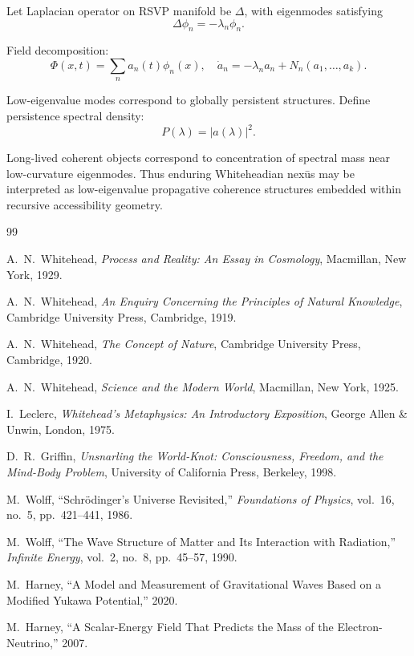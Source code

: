 \documentclass[12pt,a4paper]{article}
\begin{document}
Let Laplacian operator on RSVP manifold be \(\Delta\), with eigenmodes satisfying
\[
\Delta\phi_n
=
-\lambda_n\phi_n.
\]

Field decomposition:
\[
\Phi(x,t)
=
\sum_n
a_n(t)\phi_n(x),
\quad
\dot{a}_n
=
-\lambda_n a_n
+
N_n(a_1,\dots,a_k).
\]

Low-eigenvalue modes correspond to globally persistent structures. Define persistence spectral density:
\[
P(\lambda)
=
|a(\lambda)|^2.
\]

Long-lived coherent objects correspond to concentration of spectral mass near low-curvature eigenmodes. Thus enduring Whiteheadian nex\={u}s may be interpreted as low-eigenvalue propagative coherence structures embedded within recursive accessibility geometry.

\newpage

\begin{thebibliography}{99}

A.~N.~Whitehead,
\textit{Process and Reality: An Essay in Cosmology},
Macmillan, New York, 1929.

A.~N.~Whitehead,
\textit{An Enquiry Concerning the Principles of Natural Knowledge},
Cambridge University Press, Cambridge, 1919.

A.~N.~Whitehead,
\textit{The Concept of Nature},
Cambridge University Press, Cambridge, 1920.

A.~N.~Whitehead,
\textit{Science and the Modern World},
Macmillan, New York, 1925.

I.~Leclerc,
\textit{Whitehead's Metaphysics: An Introductory Exposition},
George Allen \& Unwin, London, 1975.

D.~R.~Griffin,
\textit{Unsnarling the World-Knot: Consciousness, Freedom, and the Mind-Body Problem},
University of California Press, Berkeley, 1998.

M.~Wolff,
``Schr\"odinger's Universe Revisited,''
\textit{Foundations of Physics},
vol.~16,
no.~5,
pp.~421--441,
1986.

M.~Wolff,
``The Wave Structure of Matter and Its Interaction with Radiation,''
\textit{Infinite Energy},
vol.~2,
no.~8,
pp.~45--57,
1990.

M.~Harney,
``A Model and Measurement of Gravitational Waves Based on a Modified Yukawa Potential,''
2020.

M.~Harney,
``A Scalar-Energy Field That Predicts the Mass of the Electron-Neutrino,''
2007.


\end{thebibliography}
\end{document}
